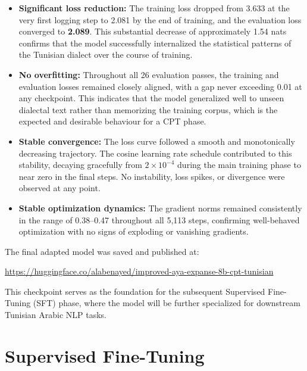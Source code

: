 \documentclass[12pt,a4paper]{report}
\begin{document}
\begin{itemize}
    \item \textbf{Significant loss reduction:} The training loss dropped from
    3.633 at the very first logging step to 2.081 by the end of training, and
    the evaluation loss converged to \textbf{2.089}. This substantial decrease
    of approximately 1.54 nats confirms that the model successfully internalized
    the statistical patterns of the Tunisian dialect over the course of
    training.

    \item \textbf{No overfitting:} Throughout all 26 evaluation passes, the
    training and evaluation losses remained closely aligned, with a gap never
    exceeding 0.01 at any checkpoint. This indicates that the model generalized
    well to unseen dialectal text rather than memorizing the training corpus,
    which is the expected and desirable behaviour for a CPT phase.

    \item \textbf{Stable convergence:} The loss curve followed a smooth and
    monotonically decreasing trajectory. The cosine learning rate schedule
    contributed to this stability, decaying gracefully from $2 \times 10^{-4}$
    during the main training phase to near zero in the final steps. No
    instability, loss spikes, or divergence were observed at any point.

    \item \textbf{Stable optimization dynamics:} The gradient norms remained
    consistently in the range of 0.38--0.47 throughout all 5,113 steps,
    confirming well-behaved optimization with no signs of exploding or
    vanishing gradients.
\end{itemize}

The final adapted model was saved and published at:
\begin{center}
\url{https://huggingface.co/alabenayed/improved-aya-expanse-8b-cpt-tunisian}
\end{center}

This checkpoint serves as the foundation for the subsequent Supervised
Fine-Tuning (SFT) phase, where the model will be further specialized for
downstream Tunisian Arabic NLP tasks.


\section{Supervised Fine-Tuning}

\end{document}
